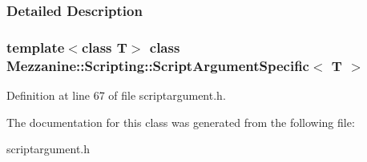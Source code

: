 \subsubsection{Detailed Description}
\subsubsection*{template$<$class T$>$ class Mezzanine::Scripting::ScriptArgumentSpecific$<$ T $>$}



Definition at line 67 of file scriptargument.h.



The documentation for this class was generated from the following file:\begin{DoxyCompactItemize}
\item 
scriptargument.h\end{DoxyCompactItemize}
